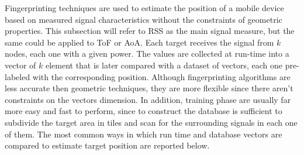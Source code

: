Fingerprinting techniques are used to estimate the position of a mobile device based on measured signal characteristics without the constraints of geometric properties. This subsection will refer to RSS as the main signal measure, but the same could be applied to ToF or AoA. Each target receives the signal from \(k\) nodes, each one with a given power. The values are collected at run-time into a vector of \(k\) element that is later compared with a dataset of vectors, each one pre-labeled with the corresponding position. Although fingerprinting algorithms are less accurate then geometric techniques, they are more flexible since there aren't constraints on the vectors dimension. In addition, training phase are usually far more easy and fast to perform, since to construct the database is sufficient to subdivide the target area in tiles and scan for the surrounding signals in each one of them.
The most common ways in which run time and database vectors are compared to estimate target position are reported below.
